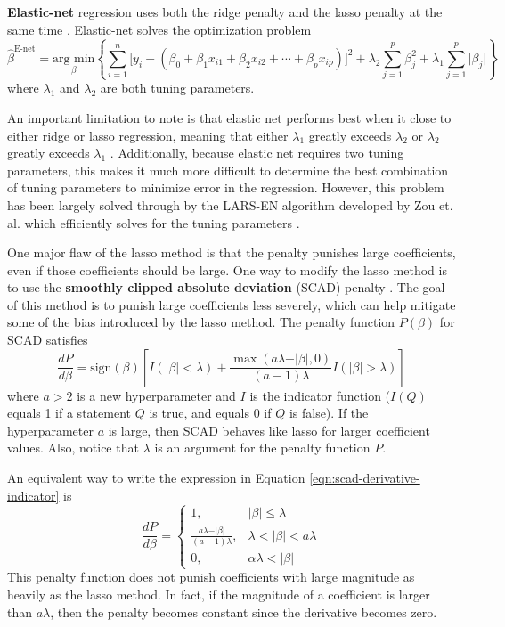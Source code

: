 \documentclass{article}
\newcommand{\argmin}[2]{\underset{#1}{\text{arg min}}\left\{#2\right\}}
\newcommand{\sign}{\text{sign}}
\begin{document}
	\textbf{Elastic-net} regression uses both the ridge penalty and the lasso penalty at the same time \cite{zou2005regularization}. Elastic-net solves the optimization problem
	\begin{equation}
		\hat{\beta}^{\text{E-net}}=\argmin{\beta}{\sum\limits_{i = 1}^n \Big[y_i - (\beta_0 + \beta_1 x_{i1} + \beta_2 x_{i2} + \cdots + \beta_p x_{ip})\Big]^2 + \lambda_2\sum\limits_{j = 1}^p \beta_j^2 + \lambda_1\sum\limits_{j = 1}^p \vert \beta_j \vert}
	\end{equation}
	where $\lambda_1$ and $\lambda_2$ are both tuning parameters.
	
	An important limitation to note is that elastic net performs best when it close to either ridge or lasso regression, meaning that either $\lambda_1$ greatly exceeds $\lambda_2$ or $\lambda_2$ greatly exceeds $\lambda_1$ \cite{zou2005regularization}. Additionally, because elastic net requires two tuning parameters, this makes it much more difficult to determine the best combination of tuning parameters to minimize error in the regression. However, this problem has been largely solved through by the LARS-EN algorithm developed by Zou et. al. which efficiently solves for the tuning parameters \cite{zou2005regularization}.
	
	One major flaw of the lasso method is that the penalty punishes large coefficients, even if those coefficients should be large. One way to modify the lasso method is to use the \textbf{smoothly clipped absolute deviation} (SCAD) penalty \cite{fan2001variable}. The goal of this method is to punish large coefficients less severely, which can help mitigate some of the bias introduced by the lasso method. The penalty function $P(\beta)$ for SCAD satisfies
	\begin{equation}\label{eqn:scad-derivative-indicator}
		\frac{dP}{d\beta} = \sign(\beta)\left[ I(\vert \beta \vert<\lambda) + \frac{\max(a\lambda - \vert \beta\vert, 0)}{(a - 1)\lambda}I(\vert \beta \vert > \lambda) \right]
	\end{equation}
	where $a>2$ is a new hyperparameter and $I$ is the indicator function ($I(Q)$ equals 1 if a statement $Q$ is true, and equals 0 if $Q$ is false). If the hyperparameter $a$ is large, then SCAD behaves like lasso for larger coefficient values. Also, notice that $\lambda$ is an argument for the penalty function $P$.
	
	An equivalent way to write the expression in Equation \ref{eqn:scad-derivative-indicator} is
	\begin{equation}
		\frac{dP}{d\beta} = \left\{\begin{array}{ll}
			1,&\vert \beta \vert\leq \lambda\\
			\frac{a\lambda - \vert \beta \vert}{(a - 1)\lambda},&\lambda < \vert \beta \vert < a\lambda\\
			0,&\alpha\lambda < \vert \beta \vert
		\end{array}\right.
	\end{equation}
	This penalty function does not punish coefficients with large magnitude as heavily as the lasso method. In fact, if the magnitude of a coefficient is larger than $a\lambda$, then the penalty becomes constant since the derivative becomes zero.
	
\end{document}

